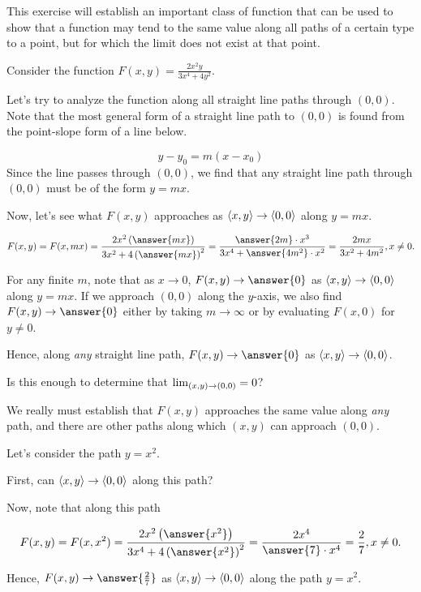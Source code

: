 \documentclass{ximera}
\author{Jim Talamo}
\begin{document}
\begin{exercise}
This exercise will establish an important class of function that can be used to show that a function may tend to the same value along all paths of a certain type to a point, but for which the limit does not exist at that point.

Consider the function $F(x,y) = \frac{2x^2y}{3x^4+4y^2}$.

Let's try to analyze the function along all straight line paths through $(0,0)$.  Note that the most general form of a straight line path to $(0,0)$ is found from the point-slope form of a line below.

\[
y-y_0=m(x-x_0)
\] 
Since the line passes through $(0,0)$, we find that any straight line path through $(0,0)$ must be of the form $y=mx$.

Now, let's see what $F(x,y)$ approaches as $\left\langle x,y\right\rangle \to \left\langle 0,0\right\rangle$ along $y=mx$.

\[F(x,y) = F(x,mx) = \frac{2x^2\left(\answer{mx}\right)}{3x^2+4\left(\answer{mx}\right)^2} = \frac{\answer{2m} \cdot x^3 }{3x^4 + \answer{4m^2}\cdot x^2} = \frac{2mx}{3x^2+4m^2}, x \neq 0.
\]
 
 For any finite $m$, note that as $x \to 0$, $F(x,y) \to \answer{0}$ as $\left\langle x,y\right\rangle \to \left\langle 0,0\right\rangle$ along $y=mx$.  If we approach $(0,0)$ along the $y$-axis, we also find $F(x,y) \to \answer{0}$ either by taking $m \to \infty$ or by evaluating $F(x,0)$ for $y \neq 0$.
 
 Hence, along \emph{any} straight line path, $F(x,y) \to \answer{0}$ as $\left\langle x,y\right\rangle \to \left\langle 0,0\right\rangle$.
 
 Is this enough to determine that $\lim_{\left(x,y\right) \to \left(0,0\right)} = 0$? 
 
 \begin{exercise}
We really must establish that $F(x,y)$ approaches the same value along \emph{any} path, and there are other paths along which $(x,y)$ can approach $(0,0)$.

Let's consider the path $y=x^2$.  

First, can $\left\langle x,y\right\rangle \to \left\langle 0,0\right\rangle$ along this path?  

Now, note that along this path

\[
F(x,y) = F(x,x^2) = \frac{2x^2\left(\answer{x^2}\right)}{3x^4+4\left(\answer{x^2}\right)^2} = \frac{2x^4}{\answer{7} \cdot x^4} = \frac{2}{7} , x \neq 0.
\]

 Hence, $F(x,y) \to \answer{\frac{2}{7}}$ as $\left\langle x,y\right\rangle \to \left\langle 0,0\right\rangle$ along the path $y=x^2$.


\end{exercise}
\end{exercise}
\end{document}
